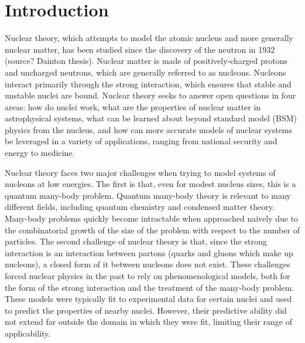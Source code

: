 \chapter{Introduction}



Nuclear theory, which attempts to model the atomic nucleus and more generally nuclear matter, has been studied since the discovery of the neutron in 1932 (source? Dainton thesis). Nuclear matter is made of positively-charged protons and uncharged neutrons, which are generally referred to as nucleons. Nucleons interact primarily through the strong interaction, which ensures that stable and unstable nuclei are bound. Nuclear theory seeks to answer open questions in four areas: how do nuclei work, what are the properties of nuclear matter in astrophysical systems, what can be learned about beyond standard model (BSM) physics from the nucleus, and how can more accurate models of nuclear systems be leveraged in a variety of applications, ranging from national security and energy to medicine.

Nuclear theory faces two major challenges when trying to model systems of nucleons at low energies. The first is that, even for modest nucleus sizes, this is a quantum many-body problem. Quantum many-body theory is relevant to many different fields, including quantum chemistry and condensed matter theory. Many-body problems quickly become intractable when approached naively due to the combinatorial growth of the size of the problem with respect to the number of particles. The second challenge of nuclear theory is that, since the strong interaction is an interaction between partons (quarks and gluons which make up nucleons), a closed form of it between nucleons does not exist. These challenges forced nuclear physics in the past to rely on phenomenological models, both for the form of the strong interaction and the treatment of the many-body problem. These models were typically fit to experimental data for certain nuclei and used to predict the properties of nearby nuclei. However, their predictive ability did not extend far outside the domain in which they were fit, limiting their range of applicability.

